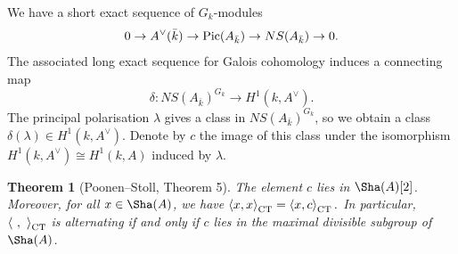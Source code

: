 \documentclass[10pt]{amsart}
\numberwithin{equation}{section}
\newtheorem{theorem}[equation]{Theorem}
\theoremstyle{remark}
\theoremstyle{definition}
\theoremstyle{definition}
\theoremstyle{definition}
\theoremstyle{definition}
\theoremstyle{definition}
\theoremstyle{definition}
\theoremstyle{definition}
\theoremstyle{definition}
\begin{document}
We have a short exact sequence of $G_k$-modules 
\begin{equation} \label{eq:untwisted_exact_seq}
0 \to A^\vee(\bar{k})\to \textup{Pic}(A_{\bar{k}})\to NS(A_{\bar{k}})\to 0.
\end{equation}
The associated long exact sequence for Galois cohomology induces a connecting map
\[\delta: NS(A_{\bar{k}})^{G_k} \to H^1(k,A^\vee).\]
The principal polarisation $\lambda$ gives a class in $NS(A_{\bar{k}})^{G_k}$, so we obtain a class $\delta(\lambda)\in H^1(k,A^\vee)$. Denote by $c$ the image of this class under the isomorphism $H^1(k,A^\vee)\cong H^1(k,A)$ induced by $\lambda$. 

\begin{theorem}[Poonen--Stoll, \cite{MR1740984} Theorem 5] \label{Thm_main_PS}
The element $c$ lies in $\Sha(A)[2]$. Moreover, for all $x\in \Sha(A)$, we have $\left \langle x,x\right \rangle_{\textup{CT}}=\left \langle x,c\right \rangle_{\textup{CT}}.$ In particular, $\left \langle ~,~\right \rangle_{\textup{CT}}$ is alternating if and only if $c$ lies in the maximal divisible subgroup of $\Sha(A)$.
\end{theorem}
\end{document}
